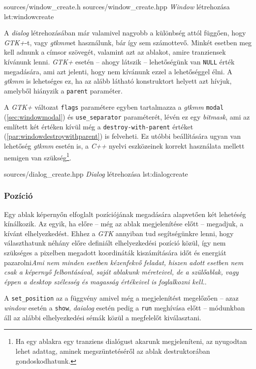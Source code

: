 \lstinputsources
{sources/window_create.h}
{sources/window_create.hpp}
{\textit{Window} létrehozása}
{lst:windowcreate}

A \textit{dialog} létrehozásában már valamivel nagyobb a különbség attól függően, hogy \textit{GTK+}-t, vagy \textit{gtkmm}et használunk, bár így sem számottevő. Minkét esetben meg kell adnunk a címsor szövegét, valamint azt az ablakot, amire tranziensek kívánunk lenni. \textit{GTK+} esetén -- ahogy látszik -- lehetőségünk van \texttt{NULL} érték megadására, ami azt jelenti, hogy nem kívánunk ezzel a lehetőséggel élni. A \textit{gtkmm} is lehetséges ez, ha az alább látható konstruktort helyett azt hívjuk, amelyből hiányzik a \texttt{parent} paraméter.

A \textit{GTK+} változat \texttt{flags} paramétere egyben tartalmazza a \textit{gtkmm} \texttt{modal} (\ref{sec:windowmodal}) és \texttt{use\_separator} paraméterét, lévén ez egy \textit{bitmask}, ami az említett két értéken kívül még a \texttt{destroy-with-parent} értéket (\ref{par:windowdestroywithparent}) is felveheti. Ez utóbbi beállítására ugyan van lehetőség \textit{gtkmm} esetén is, a \textit{C++} nyelvi eszközeinek korrekt használata mellett nemigen van szükség\footnote{Ha egy ablakra egy tranziens dialógust akarunk megjeleníteni, az nyugodtan lehet adattag, aminek megszüntetéséről az ablak destruktorában gondoskodhatunk.}.

{sources/dialog_create.hpp}
{\textit{Dialog} létrehozása}
{lst:dialogcreate}

\subsubsection{Pozíció}
\label{sec:windowpos}

Egy ablak képernyőn elfoglalt pozíciójának megadására alapvetően két lehetéség kínálkozik. Az egyik, ha előre -- még az ablak megjelenítése előtt -- megadjuk, a kívánt elhelyezkedést. Ehhez a \textit{GTK} annyiban tud segítségünkre lenni, hogy választhatunk néhány előre definiált elhelyezkedési pozíció közül, így nem szükséges a pixelben megadott koordináták kiszámítására időt és energiát pazarolni\textit{Ami nem minden esetben kézenfekvő feladat, hiszen adott esetben nem csak a képernyő felbontásával, saját ablakunk méreteivel, de a szülőablak, vagy éppen a desktop szélesség és magasság értékeivel is foglalkozni kell.}.

A \texttt{set\_position} az a függvény amivel még a megjelenítést megelőzően -- azaz \textit{window} esetén a \texttt{show}, \textit{daialog} esetén pedig a \texttt{run} meghívása előtt -- módunkban áll az alábbi elhelyezkedési sémák közül a megfelelőt kiválasztani.

